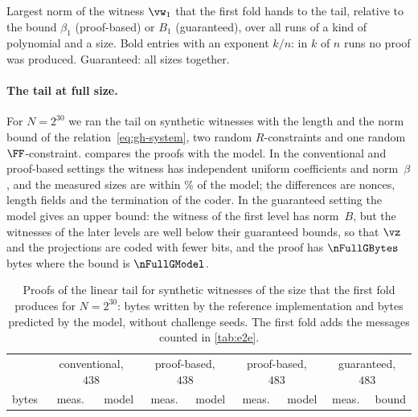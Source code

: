 \begin{table}[t]
\centering\small
\setlength{\tabcolsep}{3.6pt}

\caption{Largest norm of the witness $\vw_1$ that the first fold hands to the tail, relative to the bound $\beta_1$ (proof-based) or $B_1$ (guaranteed), over all runs of a kind of polynomial and a size. Bold entries with an exponent $k/n$: in $k$ of $n$ runs no proof was produced. Guaranteed: all sizes together.}
\label{tab:e2e-kinds}
\end{table}

\paragraph{The tail at full size.}
For $N=2^{30}$ we ran the tail on synthetic witnesses with the length and the norm bound of the relation~\eqref{eq:gh-system}, two random $R$-constraints and one random $\FF$-constraint.  compares the proofs with the model. In the conventional and proof-based settings the witness has independent uniform coefficients and norm \nFullFill$\,\beta$, and the measured sizes are within \nFullDev\% of the model; the differences are nonces, length fields and the termination of the coder. In the guaranteed setting the model gives an upper bound: the witness of the first level has norm \nFullGFill$\,B$, but the witnesses of the later levels are well below their guaranteed bounds, so that $\vz$ and the projections are coded with fewer bits, and the proof has $\nFullGBytes$ bytes where the bound is $\nFullGModel$.

\begin{table}[t]
\centering\small
\setlength{\tabcolsep}{2.9pt}
\begin{tabular}{@{}lrrrrrrrr@{}}
\toprule
 & \multicolumn{2}{c}{conventional, $438$} & \multicolumn{2}{c}{proof-based, $438$} & \multicolumn{2}{c}{proof-based, $483$} & \multicolumn{2}{c}{guaranteed, $483$}\\
\cmidrule(lr){2-3}\cmidrule(lr){4-5}\cmidrule(lr){6-7}\cmidrule(l){8-9}
bytes & meas. & model & meas. & model & meas. & model & meas. & bound\\
\midrule

\bottomrule
\end{tabular}
\caption{Proofs of the linear tail for synthetic witnesses of the size that the first fold produces for $N=2^{30}$: bytes written by the reference implementation and bytes predicted by the model, without challenge seeds. The first fold adds the messages counted in \cref{tab:e2e}.}
\label{tab:impl}
\end{table}

